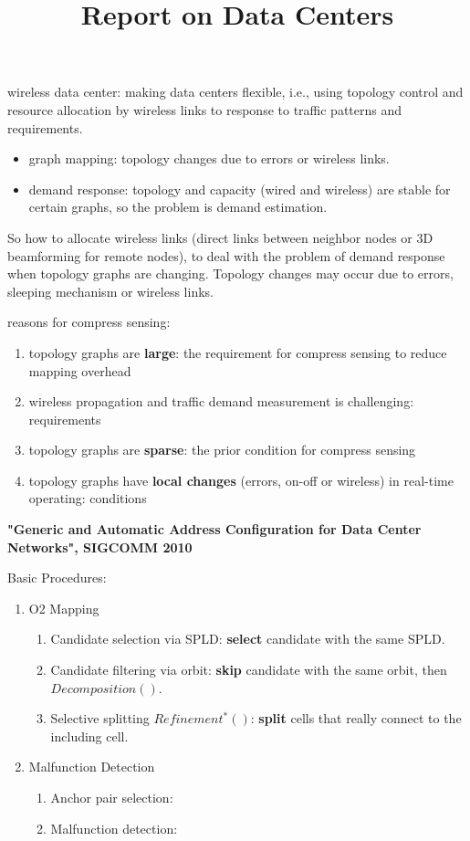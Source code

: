 \documentclass[journal,onecolumn,11pt]{IEEEtran}
\title{Report on Data Centers}
\author{\IEEEauthorblockN{Yongsen MA}
}
\begin{document}
\maketitle%

wireless data center: making data centers flexible, i.e., using topology control and resource allocation by wireless links to response to traffic patterns and requirements.
\begin{itemize}
  \item graph mapping: topology changes due to errors or wireless links.
  \item demand response: topology and capacity (wired and wireless) are stable for certain graphs, so the problem is demand estimation.
\end{itemize}
So how to allocate wireless links (direct links between neighbor nodes or 3D beamforming for remote nodes), to deal with the problem of demand response when topology graphs are changing.  Topology changes may occur due to errors, sleeping mechanism or wireless links.

reasons for compress sensing:
\begin{enumerate}
  \item topology graphs are \textbf{large}: the requirement for compress sensing to reduce mapping overhead
  \item wireless propagation and traffic demand measurement is challenging: requirements
  \item topology graphs are \textbf{sparse}: the prior condition for compress sensing
  \item topology graphs have \textbf{local changes} (errors, on-off or wireless) in real-time operating: conditions
\end{enumerate}


\textbf{"Generic and Automatic Address Configuration for Data Center Networks", SIGCOMM 2010}

Basic Procedures:
\begin{enumerate}
  \item O2 Mapping
  \begin{enumerate}
    \item Candidate selection via SPLD: \textbf{select} candidate with the same SPLD.
    \item Candidate filtering via orbit: \textbf{skip} candidate with the same orbit, then $Decomposition()$.
    \item Selective splitting $Refinement^*()$: \textbf{split} cells that really connect to the including cell.
  \end{enumerate}
  \item Malfunction Detection
  \begin{enumerate}
    \item Anchor pair selection:
    \item Malfunction detection:
  \end{enumerate}
\end{enumerate}
\end{document}
